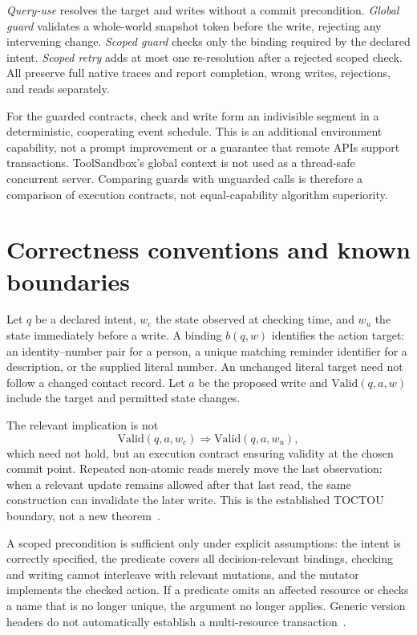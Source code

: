 \documentclass[10pt,letterpaper]{article}
\begin{document}
\emph{Query-use} resolves the target and writes without a commit precondition. \emph{Global guard} validates a whole-world snapshot token before the write, rejecting any intervening change. \emph{Scoped guard} checks only the binding required by the declared intent. \emph{Scoped retry} adds at most one re-resolution after a rejected scoped check. All preserve full native traces and report completion, wrong writes, rejections, and reads separately.

For the guarded contracts, check and write form an indivisible segment in a deterministic, cooperating event schedule. This is an additional environment capability, not a prompt improvement or a guarantee that remote APIs support transactions. ToolSandbox's global context is not used as a thread-safe concurrent server. Comparing guards with unguarded calls is therefore a comparison of execution contracts, not equal-capability algorithm superiority.

\section{Correctness conventions and known boundaries}
Let $q$ be a declared intent, $w_c$ the state observed at checking time, and $w_u$ the state immediately before a write. A binding $b(q,w)$ identifies the action target: an identity--number pair for a person, a unique matching reminder identifier for a description, or the supplied literal number. An unchanged literal target need not follow a changed contact record. Let $a$ be the proposed write and $\mathrm{Valid}(q,a,w)$ include the target and permitted state changes.

The relevant implication is not
\begin{equation}
 \mathrm{Valid}(q,a,w_c) \Longrightarrow \mathrm{Valid}(q,a,w_u),
 \label{eq:notimp}
\end{equation}
which need not hold, but an execution contract ensuring validity at the chosen commit point. Repeated non-atomic reads merely move the last observation: when a relevant update remains allowed after that last read, the same construction can invalidate the later write. This is the established TOCTOU boundary, not a new theorem~\cite{mindgap}.

A scoped precondition is sufficient only under explicit assumptions: the intent is correctly specified, the predicate covers all decision-relevant bindings, checking and writing cannot interleave with relevant mutations, and the mutator implements the checked action. If a predicate omits an affected resource or checks a name that is no longer unique, the argument no longer applies. Generic version headers do not automatically establish a multi-resource transaction~\cite{http}.
\end{document}
